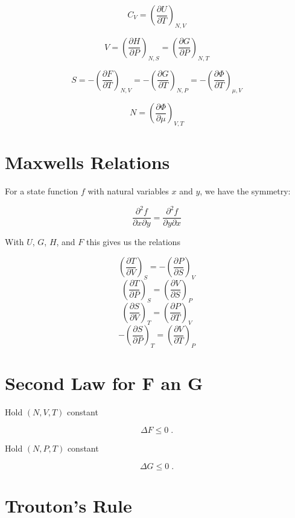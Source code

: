 \documentclass[reprint,english,notitlepage]{revtex4-1}  %
\begin{document}
\begin{equation}\label{cv}
C_V= \left ( \frac{\partial U}{\partial T} \right )_{N, V}
\end{equation}

\begin{equation}
V = \left ( \frac{\partial H}{\partial P} \right )_{N, S} = \left ( \frac{\partial G}{\partial P} \right )_{N, T}
\end{equation}

\begin{equation}\label{entdef}
S = - \left ( \frac{\partial F}{\partial T} \right )_{N, V} = -\left ( \frac{\partial G}{\partial T} \right )_{N, P} = - \left ( \frac{\partial \Phi}{\partial T} \right )_{\mu, V}
\end{equation}

\begin{equation}
N = \left ( \frac{\partial \Phi}{\partial \mu} \right )_{V, T}
\end{equation}
\section*{Maxwells Relations}

For a state function $f$ with natural variables $x$ and $y$, we have the symmetry:

\begin{equation}
\frac{\partial^2 f}{\partial x \partial y} =  \frac{\partial^2 f}{\partial y \partial x}
\end{equation}

With $U$, $G$, $H$, and $F$ this gives us the relations

$$ \left( \frac{\partial T }{\partial V} \right )_S = - \left( \frac{\partial P }{\partial S} \right )_V$$
$$ \left( \frac{\partial T }{\partial P} \right )_S = \left( \frac{\partial V }{\partial S} \right )_P $$
$$ \left( \frac{\partial S }{\partial V} \right )_T = \left( \frac{\partial P }{\partial T} \right )_V $$
$$ -\left( \frac{\partial S }{\partial P} \right )_T = \left( \frac{\partial V }{\partial T} \right )_P $$

\section*{Second Law for F an G}
Hold $(N, V, T)$ constant

$$\Delta{F} \leq 0 \; .$$

Hold $(N,P,T)$ constant

$$ \Delta{G} \leq 0 \; .$$
\section*{Trouton's Rule}
\end{document}
